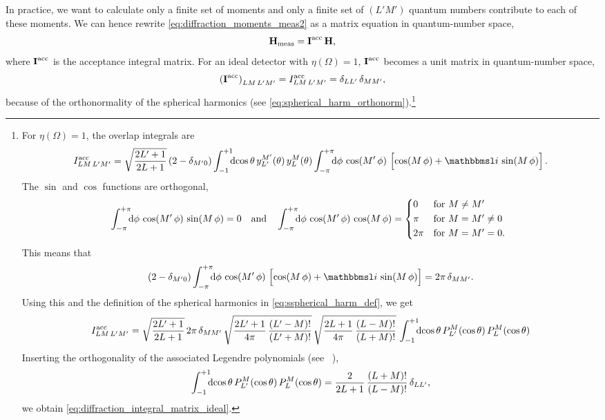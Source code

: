 In practice, we want to calculate only a finite set of moments and
only a finite set of $(L' M')$ quantum numbers contribute to each of
these moments.  We can hence rewrite
\cref{eq:diffraction_moments_meas2} as a matrix equation in
quantum-number space, \ie
\begin{equation}
  \bm{\mathrm{H}}_\text{meas}
  = \bm{\mathrm{I}}^\text{acc}\, \bm{\mathrm{H}},
\end{equation}
where $\bm{\mathrm{I}}^\text{acc}$ is the acceptance integral matrix.  For
an ideal detector with $\eta(\Omega) = 1$, $\bm{\mathrm{I}}^\text{acc}$
becomes a unit matrix in quantum-number space, \ie
\begin{equation}
  \label{eq:diffraction_integral_matrix_ideal}
  \rBrk{\mat{I}^\text{acc}}_{L M\, L' M'}
  = I^\text{acc}_{L M\, L' M'}
  = \delta_{L L'}\, \delta_{M M'},
\end{equation}
because of the orthonormality of the spherical harmonics (see
\cref{eq:spherical_harm_orthonorm}).\footnote{%
  For $\eta(\Omega) = 1$, the overlap integrals are
  \begin{equation}
    I^\text{acc}_{L M\, L' M'}
    = \sqrt{\frac{2 L' + 1}{2 L + 1}}\, (2 - \delta_{M' 0})
    \int_{-1}^{+1}\!\!\! \dif{\cos\theta}\, y_{L'}^{M'}(\theta)\, y_L^M(\theta)
    \int_{-\pi}^{+\pi}\!\!\! \dif{\phi}\, \cos(M'\, \phi)\, \sBrk[2]{\cos(M\, \phi) + \imag\, \sin(M\, \phi)}.
  \end{equation}
  The $\sin$ and $\cos$ functions are orthogonal, \ie
  \begin{equation}
    \int_{-\pi}^{+\pi}\!\!\! \dif{\phi}\, \cos(M'\, \phi)\, \sin(M\, \phi)
    = 0
    \quad\text{and}\quad
    \int_{-\pi}^{+\pi}\!\!\! \dif{\phi}\, \cos(M'\, \phi)\, \cos(M\, \phi)
    = \begin{cases*}
      0    & for $M \neq M'$ \\
      \pi  & for $M = M' \neq 0$ \\
      2\pi & for $M = M' = 0$.
    \end{cases*}
  \end{equation}
  This means that
  \begin{equation}
    (2 - \delta_{M' 0})
    \int_{-\pi}^{+\pi}\!\!\! \dif{\phi}\, \cos(M'\, \phi)\, \sBrk[2]{\cos(M\, \phi) + \imag\, \sin(M\, \phi)}
    = 2 \pi\, \delta_{M M'}.
  \end{equation}
  Using this and the definition of the spherical harmonics in
  \cref{eq:sspherical_harm_def}, we get
  \begin{equation}
    I^\text{acc}_{L M\, L' M'}
    = \sqrt{\frac{2 L' + 1}{2 L + 1}}\, 2 \pi\, \delta_{M M'}\,
    \sqrt{\frac{2 L' + 1}{4 \pi}\, \frac{(L' - M)!}{(L' + M)!}}\,
    \sqrt{\frac{2 L + 1}{4 \pi}\, \frac{(L - M)!}{(L + M)!}}\,
    \int_{-1}^{+1}\!\!\! \dif{\cos\theta}\, P_{L'}^M(\cos\theta)\, P_L^M(\cos\theta)
  \end{equation}
  Inserting the orthogonality of the associated Legendre polynomials
  (see \eg\ ), \ie
  \begin{equation}
    \int_{-1}^{+1}\!\!\! \dif{\cos\theta}\, P_{L'}^M(\cos\theta)\, P_L^M(\cos\theta)
    = \frac{2}{2 L + 1}\, \frac{(L + M)!}{(L - M)!}\, \delta_{L L'},
  \end{equation}
  we obtain \cref{eq:diffraction_integral_matrix_ideal}.
}
